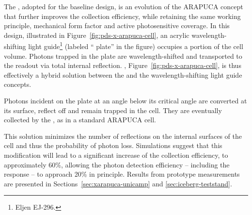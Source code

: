 
The , adopted for the baseline design, is an evolution of the ARAPUCA concept that further improves the collection efficiency, while retaining the same working principle, mechanical form factor and active photosensitive coverage. 
In this design, illustrated in  Figure~\ref{fig:pds-x-arapuca-cell}, an 
acrylic wavelength-shifting light guide\footnote{Eljen EJ-296\texttrademark{}.} (labeled `` plate'' in the figure) occupies a portion of the cell volume. Photons trapped in the plate are 
wavelength-shifted and transported to the readout via total internal reflection. 
, Figure~\ref{fig:pds-x-arapuca-cell},  is thus effectively a hybrid solution between the  and the wavelength-shifting light guide concepts. 

Photons incident on the plate at an angle below its critical angle %
 are converted at its surface, reflect off and
 remain trapped in the cell. They are eventually collected by the , as in a standard ARAPUCA cell.
 
This solution minimizes the number of reflections on the internal surfaces of the cell and thus the probability of photon loss. Simulations suggest that this modification will lead to a significant increase of the collection efficiency, to approximately 60\%, allowing the photon detection efficiency -- including the  response -- to approach 20\% in principle.  Results from prototype measurements are presented in Sections~\ref{sec:xarapuca-unicamp} and \ref{sec:iceberg-teststand}.

